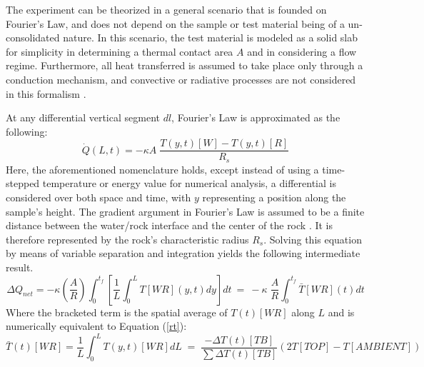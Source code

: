 The experiment can be theorized in a general scenario that is founded on Fourier's Law, and does not depend on the sample or test material being of a un-consolidated nature. In this scenario, the test material is modeled as a solid slab for simplicity in determining a thermal contact area $A$ and in considering a flow regime. Furthermore, all heat transferred is assumed to take place only through a conduction mechanism, and convective or radiative processes are not considered in this formalism \citep{theoryKern}.

\noindent At any differential vertical segment $dl$, Fourier's Law is approximated as the following:
\begin{equation}\label{fouiers}
 \dot{Q}(L,t)=-\kappa A\;\frac{T(y,t)[W]-T(y,t)[R]}{R_{s}}
\end{equation}
Here, the aforementioned nomenclature holds, except instead of using a time-stepped temperature or energy value for numerical analysis, a differential is considered over both space and time, with $y$ representing a position along the sample's height. The gradient argument in Fourier's Law is assumed to be a finite distance between the water/rock interface and the center of the rock \citep{quench}. It is therefore represented by the rock's characteristic radius $R_{s}$. Solving this equation by means of variable separation and integration yields the following intermediate result.
\begin{equation}\label{Tbar}
\Delta Q_{net}=-\kappa\left(\dfrac{A}{R}\right) \int_{0}^{t_{f}} \left[ \dfrac{1}{L}\int_{0}^{L} T[WR](y,t)dy \right]dt\:=\:-\kappa\;\frac{A}{R}\int_{0}^{t_{f}}\bar{T}[WR](t)dt
\end{equation}
Where the bracketed term is the spatial average of $T(t)[WR]$ along $L$ and is numerically equivalent to Equation (\ref{rt}):
\begin{equation}\label{spatialT}
 \bar{T}(t)[WR]=\frac{1}{L}\int_{0}^{L}T(y,t)[WR]dL\;=\;\dfrac{-\Delta T(t)[TB]}{\sum\Delta T(t)[TB]}\left(2T[TOP]-T[AMBIENT]\right)
\end{equation}

